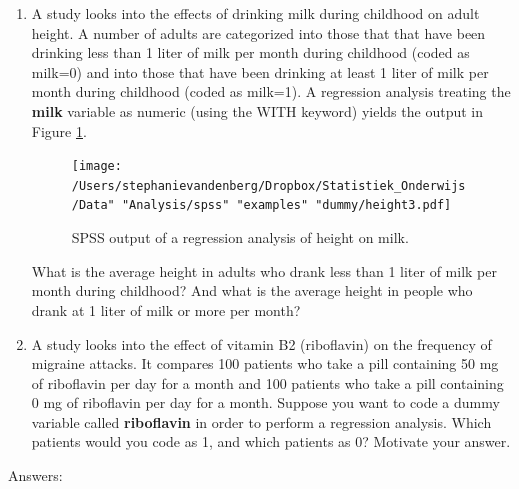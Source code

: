 \documentclass[]{report}\usepackage[]{graphicx}\usepackage[]{color}
\begin{document}
\begin{enumerate}
\item A study looks into the effects of drinking milk during childhood on adult height. A number of adults are categorized into those that that have been drinking less than 1 liter of milk per month during childhood (coded as milk=0) and into those that have been drinking at least 1 liter of milk per month during childhood (coded as milk=1). A regression analysis treating the \textbf{milk} variable as numeric (using the WITH keyword) yields the output in Figure \ref{fig:dummy_14}.

\begin{figure}[h]
    \begin{center}
       \texttt{[image: /Users/stephanievandenberg/Dropbox/Statistiek\_Onderwijs/Data" "Analysis/spss" "examples" "dummy/height3.pdf]}
    \end{center}
 \caption{SPSS output of a regression analysis of height on milk.}
 \label{fig:dummy_14}
\end{figure}

What is the average height in adults who drank less than 1 liter of milk per month during childhood? And what is the average height in people who drank at 1 liter of milk or more per month?


\item A study looks into the effect of vitamin B2 (riboflavin) on the frequency of migraine attacks. It compares 100 patients who take a pill containing 50 mg of riboflavin per day for a month and 100 patients who take a pill containing 0 mg of riboflavin per day for a month. Suppose you want to code a dummy variable called \textbf{riboflavin} in order to perform a regression analysis. Which patients would you code as 1, and which patients as 0? Motivate your answer. 

\end{enumerate}

Answers:
\end{document}

